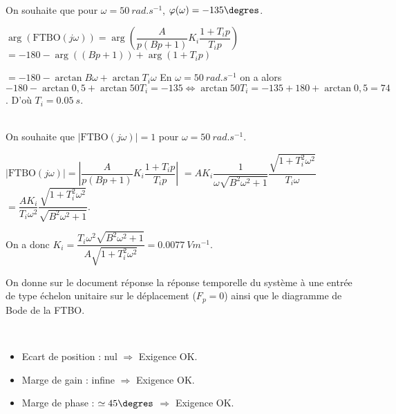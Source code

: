 \begin{multicols}{2}
\begin{corrige}
\end{corrige}
\else
\fi

\ifprof
\begin{corrige}~\\
On souhaite que  pour $\omega=\SI{50}{rad.s^{-1}}$, $\varphi(\omega)=-135\degres $.

$\arg\left(\text{FTBO}(j\omega)\right) =\arg\left(\dfrac{A}{p\left(Bp+1\right)}K_i\dfrac{1+T_ip}{T_ip}\right)	$
$ =-180-\arg\left(\left(Bp+1\right)\right)  + \arg\left(1+T_ip\right)	$

$ =-180-\arctan B\omega + \arctan T_i \omega 	$
En $\omega=\SI{50}{rad.s^{-1}}$ on a alors 
$ -180-\arctan 0,5 + \arctan 50T_i =-135 \Leftrightarrow  \arctan 50T_i =-135+180+\arctan 0,5 =74$. D'où $T_i = \SI{0,05}{s}$.
\end{corrige}
\else
\fi




\ifprof
\begin{corrige}~\\
On souhaite que $|\text{FTBO}(j\omega)|=1$ pour $\omega=\SI{50}{rad.s^{-1}}$.

$|\text{FTBO}(j\omega)| =\left|\dfrac{A}{p\left(Bp+1\right)}K_i\dfrac{1+T_ip}{T_ip}\right|$
$=A K_i\dfrac{1}{\omega \sqrt{B^2\omega^2+1}}\dfrac{\sqrt{1+T_i^2\omega^2}}{T_i \omega }$
$=\dfrac{A K_i}{T_i \omega^2}\dfrac{\sqrt{1+T_i^2\omega^2}}{ \sqrt{B^2\omega^2+1}}$.

On a donc $K_i = \dfrac{T_i \omega^2\sqrt{B^2\omega^2+1}}{A\sqrt{1+T_i^2\omega^2}}=\SI{0,0077}{Vm^{-1}}$.

\end{corrige}
\else
\fi

On donne sur le document réponse la réponse temporelle du système à une entrée de type échelon unitaire sur le déplacement ($F_p=0$) ainsi que le diagramme de Bode de la FTBO.

\ifprof
\begin{corrige}~\\
\begin{itemize}
\item Ecart de position : nul $\Rightarrow$ Exigence OK.
\item Marge de gain : infine $\Rightarrow$ Exigence OK.
\item Marge de phase : $\simeq 45\degres$ $\Rightarrow$ Exigence OK.
\end{itemize}


\end{corrige}
\end{multicols}
